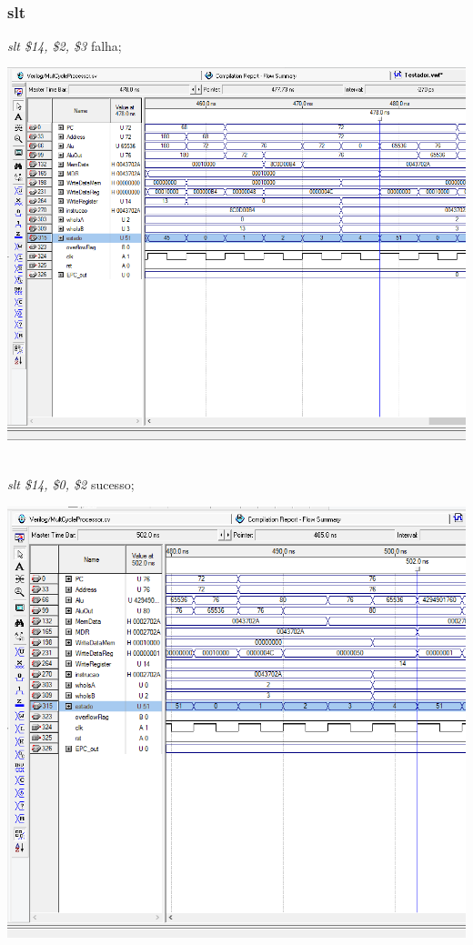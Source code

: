 \documentclass{article}
\begin{document}
    
    \\    
    \subsubsection{slt}
    {\it slt \$14, \$2, \$3} falha;\\
    \begin{center}
        \includegraphics[scale=0.25]{sltfalha.PNG}
    \end{center}
    \\
    {\it slt \$14, \$0, \$2} sucesso;\\
    \begin{center}
        \includegraphics[scale=0.25]{sltsucesso.PNG}
    \end{center}
    
\end{document}
